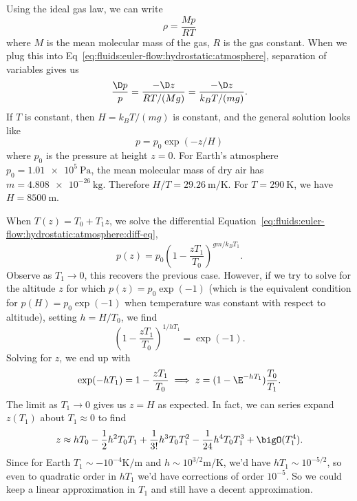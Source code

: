 \begin{node}[Hydrostatics]
\begin{node}[Atmosphere]
Using the ideal gas law, we can write
\begin{equation*}
\rho = \frac{Mp}{RT}
\end{equation*}
where $M$ is the mean molecular mass of the gas, $R$ is the gas constant.
When we plug this into Eq~\eqref{eq:fluids:euler-flow:hydrostatic:atmosphere},
separation of variables gives us
\begin{equation}\label{eq:fluids:euler-flow:hydrostatic:atmosphere:diff-eq}
\frac{\D p}{p}=\frac{-\D z}{RT/(Mg)}=\frac{-\D z}{k_{B}T/(mg)}.
\end{equation}
If $T$ is constant, then $H=k_{B}T/(mg)$ is constant, and the general
solution looks like
\begin{equation}
p=p_{0}\exp(-z/H)
\end{equation}
where $p_{0}$ is the pressure at height $z=0$. For Earth's atmosphere
$p_{0}=\qty{1.01e5}{\pascal}$, the mean molecular mass of dry air has
$m=\qty{4.808e-26}{\kilo\gram}$. Therefore $H/T=\qty{29.26}{\meter\per\kelvin}$.
For $T=\qty{290}{\kelvin}$, we have $H=\qty{8500}{\meter}$.

\begin{node}\label{fluids:euler-flow-000B}%
When $T(z)=T_{0}+T_{1}z$, we solve the differential Equation~\eqref{eq:fluids:euler-flow:hydrostatic:atmosphere:diff-eq},
\begin{equation}
p(z) = p_{0}\left(1 - \frac{z T_{1}}{T_{0}}\right)^{gm/k_{B}T_{1}}.
\end{equation}
Observe as $T_{1}\to0$, this recovers the previous case. However, if we
try to solve for the altitude $z$ for which $p(z)=p_{0}\exp(-1)$ (which
is the equivalent condition for $p(H)=p_{0}\exp(-1)$ when temperature
was constant with respect to altitude), setting $h=H/T_{0}$, we find
\begin{equation*}
\left(1 - \frac{z T_{1}}{T_{0}}\right)^{1/hT_{1}}=\exp(-1).
\end{equation*}
Solving for $z$, we end up with
\begin{equation*}
  \exp(-hT_{1})=1 - \frac{z T_{1}}{T_{0}}
  \implies
  z = (1-\E^{-hT_{1}})\frac{T_{0}}{T_{1}}.
\end{equation*}
The limit as $T_{1}\to 0$ gives us $z=H$ as expected. In fact, we can
series expand $z(T_{1})$ about $T_{1}\approx0$ to find
\begin{equation}
z\approx hT_{0}-\frac{1}{2}h^{2}T_{0}T_{1}+\frac{1}{3!}h^{3}T_{0}T_{1}^{2}-\frac{1}{24}h^{4}T_{0}T_{1}^{3}+\bigO(T_{1}^{4}).
\end{equation}
Since for Earth $T_{1}\sim-10^{-4}\unit{\kelvin\per\meter}$ and
$h\sim10^{3/2}\unit{\meter\per\kelvin}$, we'd have $hT_{1}\sim10^{-5/2}$,
so even to quadratic order in $hT_{1}$ we'd have corrections of order $10^{-5}$.
So we could keep a linear approximation in $T_{1}$ and still have a
decent approximation.


\end{node}
\end{node}
\end{node}
